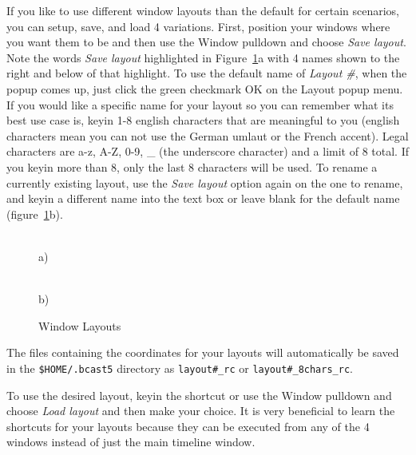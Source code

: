 If you like to use different window layouts than the default for certain scenarios, you can setup, save, and load 4 variations.   
First, position your \CGG{} windows where you want them to be and then use the Window pulldown and choose \emph{Save layout}. Note the words \emph{Save layout} highlighted in Figure~\ref{fig:window_layouts}a with 4 names shown to the right and below of that highlight. 
To use the default name of \textit{Layout \#}, when the popup comes up, just click the green checkmark OK on the Layout popup menu.  
If you would like a specific name for your layout so you can remember what its best use case is,
keyin 1-8 english characters that are meaningful to you (english characters mean you can not use the German umlaut or the French accent).  
Legal characters are a-z, A-Z, 0-9, \_ (the underscore character) and a limit of 8 total.  
If you keyin more than 8, only the last 8 characters will be used.  
To rename a currently existing layout, use the \emph{Save layout} option again on the one to rename, and keyin a different name into the text box or leave blank for the default name (figure~\ref{fig:window_layouts}b).

\begin{figure}[htpb]
    \centering
    \begin{minipage}{.49\linewidth}
        \\ a)
    \end{minipage}
    \begin{minipage}{.49\linewidth}
        \vspace{13ex}
        \\ b)
    \end{minipage}
    \caption{Window Layouts}
    \label{fig:window_layouts}
\end{figure}

The files containing the coordinates for your layouts will automatically be saved in the \texttt{\$HOME/.bcast5} directory as \texttt{layout\#\_rc} or \texttt{layout\#\_8chars\_rc}.

To use the desired layout, keyin the shortcut or use the Window pulldown and choose \emph{Load layout} and then make your choice. It is very beneficial to learn the shortcuts for your
layouts because they can be executed from any of the 4 windows instead of just the main
timeline window.

